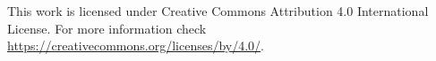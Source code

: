 \documentclass{beamer}
\begin{document}


\begin{frame}
  \vfill
  \centering
  This work is licensed under Creative Commons Attribution 4.0 International License.
  For more information check \url{https://creativecommons.org/licenses/by/4.0/}.
  \vfill
\end{frame}
\end{document}
